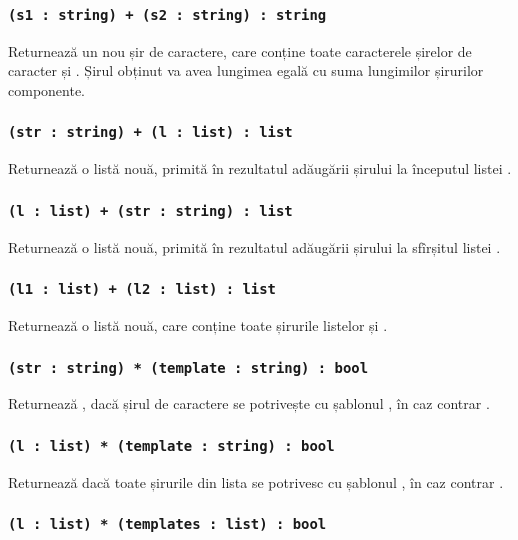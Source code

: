 \subsubsection{\lstinline|(s1 : string) + (s2 : string) : string|}

Returnează un nou șir de caractere, care conține toate caracterele șirelor de caracter  și . Șirul obținut va avea lungimea egală cu suma lungimilor șirurilor componente.

\subsubsection{\lstinline|(str : string) + (l : list) : list|}

Returnează o listă nouă, primită în rezultatul adăugării șirului  la începutul listei .

\subsubsection{\lstinline|(l : list) + (str : string) : list|}

Returnează o listă nouă, primită în rezultatul adăugării șirului  la sfîrșitul listei .

\subsubsection{\lstinline|(l1 : list) + (l2 : list) : list|}

Returnează o listă nouă, care conține toate șirurile listelor  și .

\subsubsection{\lstinline|(str : string) * (template : string) : bool|}

Returnează \true{}, dacă șirul de caractere  se potrivește cu șablonul , în caz contrar \false{}.

\subsubsection{\lstinline|(l : list) * (template : string) : bool|}

Returnează \true{} dacă toate șirurile din lista  se potrivesc cu șablonul , în caz contrar \false{}.

\subsubsection{\lstinline|(l : list) * (templates : list) : bool|}

